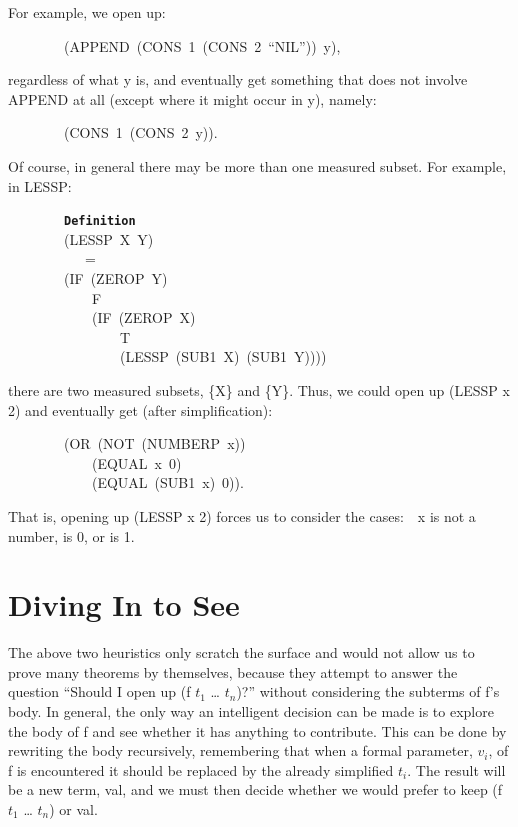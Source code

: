 \documentclass[11pt]{book}
\newenvironment{pubasis}{\begin{flushleft}\ttfamily\small}{\normalsize\rmfamily\end{flushleft}}
\newcommand{\axiomordefinition}[1]{\vspace{6pt}\texttt{\textbf{#1}}}
\newcommand{\pubdefaulttextsize}{\large}
\begin{document}
For example, we open up:
\begin{pubasis}
~~~~~~~~(APPEND~(CONS~1~(CONS~2~``NIL''))~y),\\
\end{pubasis}
regardless of what y is, and eventually get something that does not
involve APPEND at all (except where it might occur in y), namely:
\begin{pubasis}
~~~~~~~~(CONS~1~(CONS~2~y)).\\
\end{pubasis}
Of course, in general there may be more than one measured subset.
For example, in LESSP:
\begin{pubasis}
~~~~~~~~\axiomordefinition{Definition}\\
~~~~~~~~(LESSP~X~Y)\\
~~~~~~~~~~~=\\
~~~~~~~~(IF~(ZEROP~Y)\\
~~~~~~~~~~~~F\\
~~~~~~~~~~~~(IF~(ZEROP~X)\\
~~~~~~~~~~~~~~~~T\\
~~~~~~~~~~~~~~~~(LESSP~(SUB1~X)~(SUB1~Y))))\\
\end{pubasis}
there are two measured subsets, \{X\} and \{Y\}.  Thus,
we could open up (LESSP x 2) and eventually get (after simplification):
\begin{pubasis}
~~~~~~~~(OR~(NOT~(NUMBERP~x))\\
~~~~~~~~~~~~(EQUAL~x~0)\\
~~~~~~~~~~~~(EQUAL~(SUB1~x)~0)).\\
\end{pubasis}
That is, opening up (LESSP x 2) forces us to
consider the cases:~~x is not a number, is 0, or is 1.
\section{Diving In to See}
\pubdefaulttextsize
The above two heuristics only scratch the surface and would not
allow us to prove many theorems by themselves,  because they
attempt to answer the question ``Should I open up (f $t_{1}$ \ldots{} $t_{n}$)?''
without considering the subterms of f's body.
In general, the only way an intelligent decision can be made is to
explore the body of f and see whether it has anything to
contribute.  This can be done by  rewriting the body recursively,
remembering that when a formal parameter, $v_{i}$, of f is encountered
it should be replaced by the already simplified $t_{i}$.
The result will be a new term, val, and we
must then  decide whether we would prefer to keep (f $t_{1}$ \ldots{} $t_{n}$)
or val.
\end{document}
